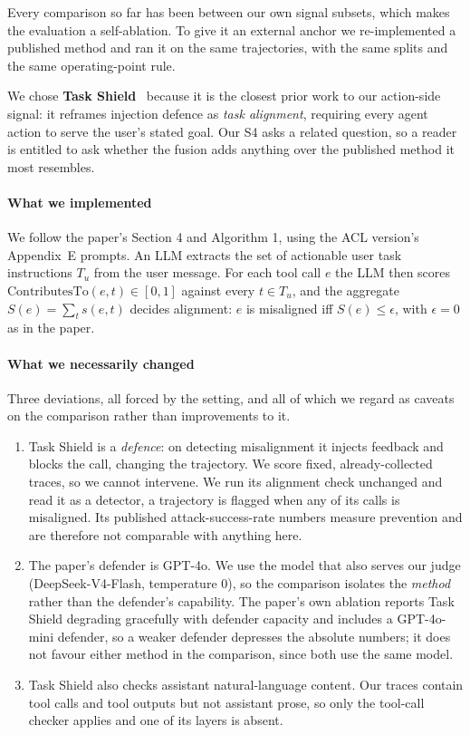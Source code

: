 \documentclass[pdflatex,sn-basic]{sn-jnl}%
\theoremstyle{thmstyleone}
\theoremstyle{thmstyletwo}
\theoremstyle{thmstylethree}
\begin{document}
Every comparison so far has been between our own signal subsets, which makes the
evaluation a self-ablation. To give it an external anchor we re-implemented a
published method and ran it on the same trajectories, with the same splits and the
same operating-point rule.

We chose \textbf{Task Shield}~\citep{jia2024taskshield} because it is the closest
prior work to our action-side signal: it reframes injection defence as
\emph{task alignment}, requiring every agent action to serve the user's stated
goal. Our S4 asks a related question, so a reader is entitled to ask whether the
fusion adds anything over the published method it most resembles.

\paragraph{What we implemented} We follow the paper's Section 4 and Algorithm 1,
using the ACL version's Appendix~E prompts. An LLM extracts the set of actionable user task
instructions $T_u$ from the user message. For each tool call $e$ the LLM then
scores $\mathrm{ContributesTo}(e,t) \in [0,1]$ against every $t \in T_u$, and the
aggregate $S(e) = \sum_{t} s(e,t)$ decides alignment: $e$ is misaligned iff
$S(e) \le \epsilon$, with $\epsilon = 0$ as in the paper.

\paragraph{What we necessarily changed} Three deviations, all forced by the
setting, and all of which we regard as caveats on the comparison rather than
improvements to it.
\begin{enumerate}
\item Task Shield is a \emph{defence}: on detecting misalignment it injects
feedback and blocks the call, changing the trajectory. We score fixed,
already-collected traces, so we cannot intervene. We run its alignment check
unchanged and read it as a detector, a trajectory is flagged when any of its
calls is misaligned. Its published attack-success-rate numbers measure prevention
and are therefore not comparable with anything here.
\item The paper's defender is GPT-4o. We use the model that also serves our judge
(DeepSeek-V4-Flash, temperature $0$), so the comparison isolates the \emph{method}
rather than the defender's capability. The paper's own ablation reports Task Shield
degrading gracefully with defender capacity and includes a GPT-4o-mini defender, so
a weaker defender depresses the absolute numbers; it does not favour either method
in the comparison, since both use the same model.
\item Task Shield also checks assistant natural-language content. Our traces
contain tool calls and tool outputs but not assistant prose, so only the tool-call
checker applies and one of its layers is absent.
\end{enumerate}
\end{document}
